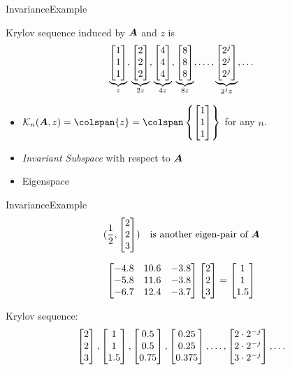 \documentclass{beamer}
\begin{document}
\begin{frame}{Invariance}{Example}%

Krylov sequence induced by $\bm{A}$ and $z$ is
\[
\underbrace{\begin{bmatrix} 1\\1\\1\end{bmatrix}}_{z}, \underbrace{\begin{bmatrix} 2\\2\\2\end{bmatrix}}_{2z}, 
\underbrace{\begin{bmatrix} 4\\4\\4\end{bmatrix}}_{4z}, \underbrace{\begin{bmatrix} 8\\8\\8\end{bmatrix}}_{8z}, \ldots, 
\underbrace{\begin{bmatrix} 2^j\\2^j\\2^j\end{bmatrix}}_{2^j z}
, \ldots   
\]

\begin{itemize}
\item $\krylov{n}{\A}{z} = \colspan\{z\} = \colspan \left\{ \mat{1\\1\\1} \right\}$
for any $n$.
\item \emph{Invariant Subspace} with respect to $\bm{A}$
\item Eigenspace
\end{itemize}
\end{frame}


\begin{frame}{Invariance}{Example}%
 \[
 (\frac{1}{2},\begin{bmatrix} 2\\2\\3\end{bmatrix}) \quad\text{is another eigen-pair of } \bm{A} 
 \]
 
 \[
 \begin{bmatrix} 
    -4.8 & 10.6 & -3.8 \\
    -5.8 & 11.6 & -3.8 \\
    -6.7 & 12.4 & -3.7 \end{bmatrix} 
 \begin{bmatrix} 2\\2\\3\end{bmatrix} = \begin{bmatrix} 1\\1\\1.5\end{bmatrix}
 \]

 Krylov sequence:
 \[
 \begin{bmatrix} 2\\2\\3\end{bmatrix}, \begin{bmatrix} 1\\1\\1.5\end{bmatrix}, \begin{bmatrix} 0.5\\ 0.5\\ 0.75\end{bmatrix}, \begin{bmatrix} 0.25\\0.25\\ 0.375\end{bmatrix},
 \ldots, \begin{bmatrix} 2\cdot 2^{-j}\\2\cdot 2^{-j}\\ 3\cdot 2^{-j}\end{bmatrix}, \ldots
 \]
\end{frame}
 
\end{document}

